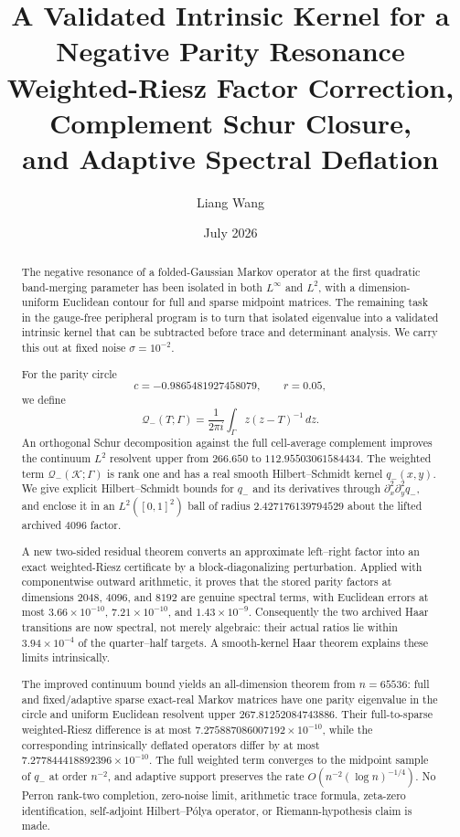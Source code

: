 \documentclass[11pt]{article}
\title{A Validated Intrinsic Kernel for a Negative Parity Resonance\\
\large Weighted-Riesz Factor Correction, Complement Schur Closure,\\
and Adaptive Spectral Deflation}
\author{Liang Wang}
\date{July 2026}
\theoremstyle{definition}
\theoremstyle{remark}
\newcommand{\cK}{\mathcal K}
\newcommand{\cQ}{\mathcal Q}
\begin{document}
\maketitle

\begin{abstract}
The negative resonance of a folded-Gaussian Markov operator at the first
quadratic band-merging parameter has been isolated in both $L^\infty$ and
$L^2$, with a dimension-uniform Euclidean contour for full and sparse
midpoint matrices.  The remaining task in the gauge-free peripheral program
is to turn that isolated eigenvalue into a validated intrinsic kernel that
can be subtracted before trace and determinant analysis.  We carry this out
at fixed noise $\sigma=10^{-2}$.

For the parity circle
\[
 c=-0.9865481927458079,\qquad r=0.05,
\]
we define
\[
 \cQ_-(T;\Gamma)
 =\frac{1}{2\pi i}\int_\Gamma z(z-T)^{-1}\,dz.
\]
An orthogonal Schur decomposition against the full cell-average complement
improves the continuum $L^2$ resolvent upper from $266.650$ to
$112.95503061584434$.  The weighted term $\cQ_-(\cK;\Gamma)$ is rank one
and has a real smooth Hilbert--Schmidt kernel $q_-(x,y)$.  We give explicit
Hilbert--Schmidt bounds for $q_-$ and its derivatives through
$\partial_x^2\partial_y^2q_-$, and enclose it in an $L^2([0,1]^2)$ ball of
radius $2.427176139794529$ about the lifted archived $4096$ factor.

A new two-sided residual theorem converts an approximate left--right factor
into an exact weighted-Riesz certificate by a block-diagonalizing
perturbation.  Applied with componentwise outward arithmetic, it proves that
the stored parity factors at dimensions $2048$, $4096$, and $8192$ are
genuine spectral terms, with Euclidean errors at most
$3.66\times10^{-10}$, $7.21\times10^{-10}$, and
$1.43\times10^{-9}$.  Consequently the two archived Haar transitions are
now spectral, not merely algebraic: their actual ratios lie within
$3.94\times10^{-4}$ of the quarter--half targets.  A smooth-kernel Haar
theorem explains these limits intrinsically.

The improved continuum bound yields an all-dimension theorem from
$n=65536$: full and fixed/adaptive sparse exact-real Markov matrices have
one parity eigenvalue in the circle and uniform Euclidean resolvent upper
$267.81252084743886$.  Their full-to-sparse weighted-Riesz difference is at
most $7.275887086007192\times10^{-10}$, while the corresponding intrinsically
deflated operators differ by at most
$7.277844418892396\times10^{-10}$.  The full weighted term converges to the
midpoint sample of $q_-$ at order $n^{-2}$, and adaptive support preserves
the rate $O(n^{-2}(\log n)^{-1/4})$.  No Perron rank-two completion,
zero-noise limit, arithmetic trace formula, zeta-zero identification,
self-adjoint Hilbert--P\'olya operator, or Riemann-hypothesis claim is made.
\end{abstract}
\end{document}
